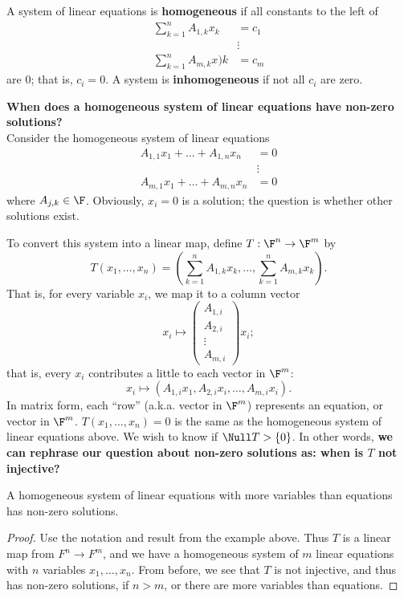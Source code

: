 \documentclass[math0540-lecture-notes.tex]{subfiles}
\begin{document}
\begin{definition}{}
  A system of linear equations is \textbf{homogeneous} if all constants to the left of
  \begin{align*}
    \sum_{k=1}^{n} A_{1,k}x_k&=c_1\\
                             &\vdots\\
    \sum_{k=1}^{n} A_{m,k}x)k&=c_m
  \end{align*} are $0$; that is, $c_i=0$. A system is \textbf{inhomogeneous} if not all $c_i$ are
  zero.
\end{definition}
\begin{example}
  \textbf{When does a homogeneous system of linear equations have non-zero solutions?} \\
  Consider the homogeneous system of linear equations
  \begin{align*}
    A_{1,1}x_1+\ldots+A_{1,n}x_n&= 0 \\
                                &\vdots\\
    A_{m,1}x_1+\ldots+A_{m,n}x_n&= 0
  \end{align*} where $A_{j,k}\in \F$. Obviously, $x_i=0$ is a solution; the question is whether
  other solutions exist.

  To convert this system into a linear map, define $T:\F^{n}\to \F^{m}$ by \[
    T(x_1,\ldots,x_n)=\left( \sum_{k=1}^{n} A_{1,k}x_k,\ldots,\sum_{k=1}^{n} A_{m,k}x_k \right) 
  .\] That is, for every variable $x_i$, we map it to a column vector \[
    x_i \longmapsto \begin{pmatrix} A_{1,i}\\ A_{2,i}\\\vdots\\A_{m,i} \end{pmatrix} x_i
  ;\] that is, every $x_i$ contributes a little to each vector in  $\F^m$: \[
    x_i \longmapsto \left( A_{1,i}x_1,A_{2,i}x_i,\ldots,A_{m,i}x_i \right) 
  .\] In matrix form, each ``row'' (a.k.a. vector in $\F^{m}$) represents an equation, or vector in
  $\F^m$. $T(x_1,\ldots,x_n)=0$ is the same as the homogeneous system of linear equations above. We
  wish to know if $ \Null T > \{ 0 \}$. In other words, \textbf{we can rephrase our question about
  non-zero solutions as: when is $T$ not injective?} 
\end{example}

\begin{proposition}{}
  A homogeneous system of linear equations with more variables than equations has non-zero
  solutions.
\end{proposition}
\begin{proof}[Proof]
  Use the notation and result from the example above. Thus $T$ is a linear map from $F^{n}\to F^m$,
  and we have a homogeneous system of $m$ linear equations with $n$ variables $ x_1,\ldots,x_n$.
  From before, we see that $T$ is not injective, and thus has non-zero solutions, if $n>m$, or there
  are more variables than equations.
\end{proof}
\end{document}
